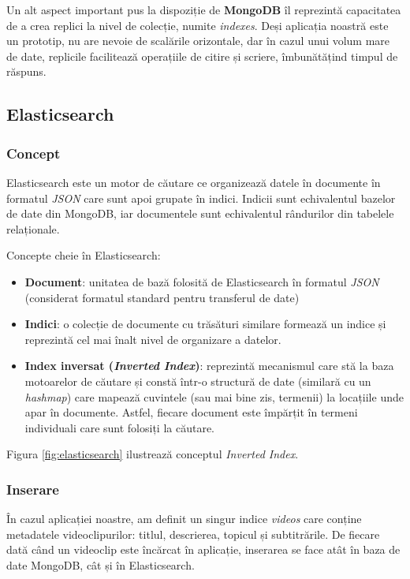 \par
Un alt aspect important pus la dispoziție de \textbf{MongoDB} îl reprezintă capacitatea de a crea replici
la nivel de colecție, numite \textit{indexes}. Deși aplicația noastră este un prototip, nu are nevoie 
de scalările orizontale, dar în cazul unui volum mare de date, replicile facilitează operațiile de
citire și scriere, îmbunătățind timpul de răspuns.

\subsection{Elasticsearch}
\subsubsection{Concept}
Elasticsearch este un motor de căutare ce organizează datele în documente în formatul \textit{JSON} care
sunt apoi grupate în indici. Indicii sunt echivalentul bazelor de date din MongoDB, iar documentele sunt
echivalentul rândurilor din tabelele relaționale.

\par
Concepte cheie în Elasticsearch:
\begin{itemize}
    \item \textbf{Document}: unitatea de bază folosită de Elasticsearch în formatul \textit{JSON}
    (considerat formatul standard pentru transferul de date)
    \item \textbf{Indici}: o colecție de documente cu trăsături similare formează un indice și reprezintă
    cel mai înalt nivel de organizare a datelor.
    \item \textbf{Index inversat (\textit{Inverted Index})}: reprezintă mecanismul care stă la baza motoarelor de căutare și constă
    într-o structură de date (similară cu un \textit{hashmap}) care mapează cuvintele (sau mai bine zis, termenii)
    la locațiile unde apar în documente. Astfel, fiecare document este împărțit în termeni individuali 
    care sunt folosiți la căutare.
\end{itemize}

\par
Figura \ref{fig:elasticsearch} ilustrează conceptul \textit{Inverted Index}. \cite{elasticsearchexplained}

\subsubsection{Inserare}
\par
În cazul aplicației noastre, am definit un singur indice \textit{videos} care conține metadatele
videoclipurilor: titlul, descrierea, topicul și subtitrările. De fiecare dată când un videoclip
este încărcat în aplicație, inserarea se face atât în baza de date MongoDB, cât și în Elasticsearch.

